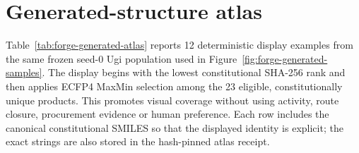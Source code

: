 \documentclass{article}
\begin{document}
\clearpage

\clearpage

\section{Generated-structure atlas}
\label{app:atlas}
Table~\ref{tab:forge-generated-atlas} reports 12 deterministic display examples
from the same frozen seed-0 Ugi population used in Figure~\ref{fig:forge-generated-samples}. The
display begins with the lowest constitutional SHA-256 rank and then applies ECFP4 MaxMin selection
among the 23 eligible, constitutionally unique products. This promotes visual coverage without using
activity, route closure, procurement evidence or human preference. Each row includes the canonical
constitutional SMILES so that the displayed identity is explicit; the exact strings are also stored
in the hash-pinned atlas receipt.
\end{document}
